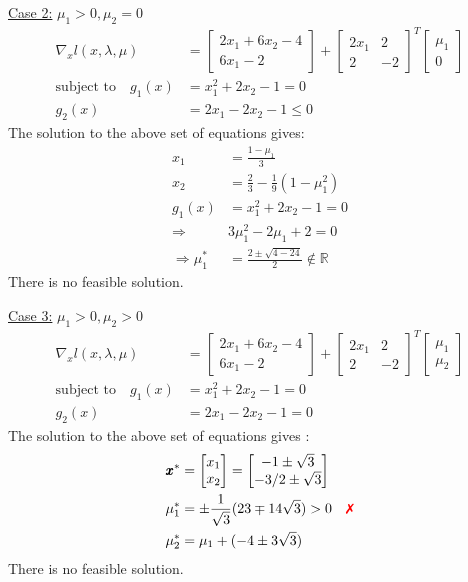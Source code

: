 \documentclass[a4paper,11pt]{article}
\newcommand{\V}[1]{\pmb{#1}}
\newcommand{\mat}[1]{\begin{bmatrix}#1\end{bmatrix}}
\newcommand{\xmark}{{\color{red}\text{\ding{55}}}}%
\begin{document}
\noindent\underline{Case 2:} $\mu_1>0,\mu_2=0$
\begin{align*}
 \nabla_x l(x,\lambda,\mu) &= \mat{2x_1 +6x_2 -4\\ 6x_1 -2} +
\mat{2x_1 & 2\\ 2&  -2}^T\mat{\mu_1\\ 0}\\
% 
 \text{subject to}\quad g_1(x)&=x_1^2 +2x_2-1 = 0\\
 g_2(x)&=2x_1-2x_2-1\leq 0
\end{align*}
The solution to the above set of equations gives:
\begin{align*}
x_1 &= \frac{1-\mu_1}{3}\\
x_2 &= \frac{2}{3} - \frac{1}{9}(1-\mu_1^2)\\
g_1(x)&= x_1^2 +2x_2 -1 = 0\\
\Rightarrow& 3\mu_1^2 -2\mu_1+ 2 = 0\\
\Rightarrow \mu_1^*&= \frac{2\pm\sqrt{4-24}}{2} \notin \mathbb{R}  
\end{align*}
There is no feasible solution.

\noindent\underline{Case 3:} $\mu_1>0, \mu_2>0$
\begin{align*}
 \nabla_x l(x,\lambda,\mu) &= \mat{2x_1 +6x_2 -4\\ 6x_1 -2} +
\mat{2x_1 & 2\\ 2&  -2}^T\mat{\mu_1\\ \mu_2}\\
% 
 \text{subject to}\quad g_1(x)&=x_1^2 +2x_2-1 = 0\\
 g_2(x)&=2x_1-2x_2-1= 0
\end{align*}
The solution to the above set of equations gives :
\begin{align*}
 \V{x}^*&=\mat{x_1\\x_2} = \mat{-1\pm \sqrt{3}\\-3/2 \pm \sqrt{3}}\\
 \mu_1^*&=\pm\frac{1}{\sqrt{3}}(23\mp14\sqrt{3}) >0 \quad \xmark\\
  \mu_2^*&= \mu_1 + (-4\pm3\sqrt{3})
\end{align*}
There is no feasible solution.
\end{document}
